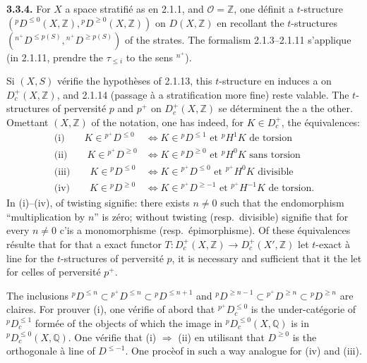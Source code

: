 \documentclass[12pt,a4paper]{article}
\theoremstyle{plain}
\theoremstyle{definition}
\newcommand{\cO}{\mathcal{O}}
\providecommand{\cO}{\mathcal{O}}
\begin{document}
\noindent\textbf{3.3.4.} For $X$ a space stratifi\'{e} as en 2.1.1, and $\cO = \mathbb{Z}$, one d\'{e}finit a $t$-structure $({}^{p}D^{\leq 0}(X,\mathbb{Z}), {}^{p}D^{\geq 0}(X,\mathbb{Z}))$ on $D(X,\mathbb{Z})$ en recollant the $t$-structures $(\phantom{}^{n^{+}}D^{\leq p(S)}, \phantom{}^{n^{+}}D^{\geq p(S)})$ of the strates. The formalism 2.1.3--2.1.11 s'applique (in 2.1.11, prendre the $\tau_{\leq i}$ to the sens $\phantom{}^{n^{+}}$).

Si $(X,S)$ v\'{e}rifie the hypoth\`{e}ses of 2.1.13, this $t$-structure en induces a on $D_{c}^{+}(X,\mathbb{Z})$, and 2.1.14 (passage \`{a} a stratification more fine) reste valable. The $t$-structures of perversit\'{e} $p$ and $p^{+}$ on $D_{c}^{+}(X,\mathbb{Z})$ se d\'{e}terminent the a the other. Omettant $(X,\mathbb{Z})$ of the notation, one has indeed, for $K \in D_{c}^{+}$, the \'{e}quivalences:
\begin{align*}
\text{(i)}\qquad K \in {}^{p^{+}}D^{\leq 0} &\iff K \in {}^{p}D^{\leq 1} \text{ et } {}^{p}H^{1}K \text{ de torsion} \\
\text{(ii)}\qquad K \in {}^{p^{+}}D^{\geq 0} &\iff K \in {}^{p}D^{\geq 0} \text{ et } {}^{p}H^{0}K \text{ sans torsion} \\
\text{(iii)}\qquad K \in {}^{p}D^{\leq 0} &\iff K \in {}^{p^{+}}D^{\leq 0} \text{ et } {}^{p^{+}}H^{0}K \text{ divisible} \\
\text{(iv)}\qquad K \in {}^{p}D^{\geq 0} &\iff K \in {}^{p^{+}}D^{\geq -1} \text{ et } {}^{p^{+}}H^{-1}K \text{ de torsion.}
\end{align*}
In (i)--(iv), of twisting signifie: there exists $n \neq 0$ such that the endomorphism ``multiplication by $n$'' is z\'{e}ro; without twisting (resp.\ divisible) signifie that for every $n \neq 0$ c'is a monomorphisme (resp.\ \'{e}pimorphisme). Of these \'{e}quivalences r\'{e}sulte that for that a exact functor $T: D_{c}^{+}(X,\mathbb{Z}) \longrightarrow D_{c}^{+}(X',\mathbb{Z})$ let $t$-exact \`{a} line for the $t$-structures of perversit\'{e} $p$, it is necessary and sufficient that it the let for celles of perversit\'{e} $p^{+}$.

The inclusions ${}^{p}D^{\leq n} \subset {}^{p^{+}}D^{\leq n} \subset {}^{p}D^{\leq n+1}$ and ${}^{p}D^{\geq n-1} \subset {}^{p^{+}}D^{\geq n} \subset {}^{p}D^{\geq n}$ are claires. For prouver (i), one v\'{e}rifie of abord that ${}^{p^{+}}D_{c}^{\leq 0}$ is the under-cat\'{e}gorie of ${}^{p}D_{c}^{\leq 1}$ form\'{e}e of the objects of which the image in ${}^{p}D_{c}^{\leq 0}(X,\mathbb{Q})$ is in ${}^{p}D_{c}^{\leq 0}(X,\mathbb{Q})$. One v\'{e}rifie that (i) $\Rightarrow$ (ii) en utilisant that $D^{\geq 0}$ is the orthogonale \`{a} line of $D^{\leq -1}$. One proc\`{e}of in such a way analogue for (iv) and (iii).
\end{document}
